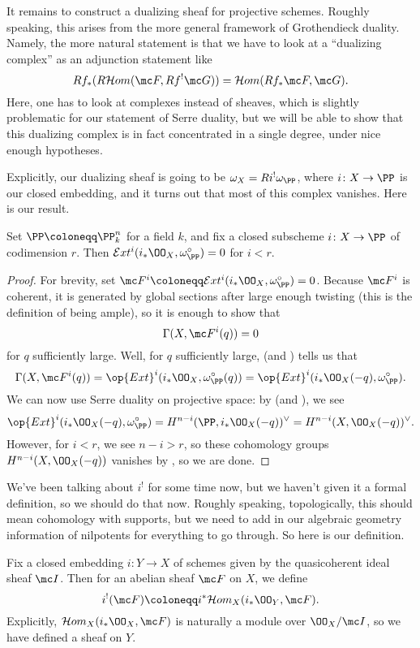 \documentclass[../notes.tex]{subfiles}
\begin{document}
It remains to construct a dualizing sheaf for projective schemes. Roughly speaking, this arises from the more general framework of Grothendieck duality. Namely, the more natural statement is that we have to look at a ``dualizing complex'' as an adjunction statement like
\[Rf_*(R\mathcal Hom(\mc F,Rf^!\mc G))=\mathcal Hom(Rf_*\mc F,\mc G).\]
Here, one has to look at complexes instead of sheaves, which is slightly problematic for our statement of Serre duality, but we will be able to show that this dualizing complex is in fact concentrated in a single degree, under nice enough hypotheses.

Explicitly, our dualizing sheaf is going to be $\omega_X=Ri^!\omega_\PP$, where $i\colon X\to\PP$ is our closed embedding, and it turns out that most of this complex vanishes. Here is our result.
\begin{proposition} \label{prop:lower-codim-dies}
	Set $\PP\coloneqq\PP^n_k$ for a field $k$, and fix a closed subscheme $i\colon X\to\PP$ of codimension $r$. Then $\mathcal Ext^i(i_*\OO_X,\omega_\PP^\circ)=0$ for $i<r$.
\end{proposition}
\begin{proof}
	For brevity, set $\mc F^i\coloneqq\mathcal Ext^i(i_*\OO_X,\omega_\PP^\circ)=0$. Because $\mc F^i$ is coherent, it is generated by global sections after large enough twisting (this is the definition of being ample), so it is enough to show that
	\[\Gamma(X,\mc F^i(q))=0\]
	for $q$ sufficiently large. Well, for $q$ sufficiently large,  (and ) tells us that
	\[\Gamma(X,\mc F^i(q))=\op{Ext}^i(i_*\OO_X,\omega^\circ_\PP(q))=\op{Ext}^i(i_*\OO_X(-q),\omega^\circ_\PP).\]
	We can now use Serre duality on projective space: by  (and ), we see
	\[\op{Ext}^i(i_*\OO_X(-q),\omega^\circ_\PP)=H^{n-i}(\PP,i_*\OO_X(-q))^\lor=H^{n-i}(X,\OO_X(-q))^\lor.\]
	However, for $i<r$, we see $n-i>r$, so these cohomology groups $H^{n-i}(X,\OO_X(-q))$ vanishes by , so we are done.
\end{proof}
We've been talking about $i^!$ for some time now, but we haven't given it a formal definition, so we should do that now. Roughly speaking, topologically, this should mean cohomology with supports, but we need to add in our algebraic geometry information of nilpotents for everything to go through. So here is our definition.
\begin{definition}
	Fix a closed embedding $i\colon Y\to X$ of schemes given by the quasicoherent ideal sheaf $\mc I$. Then for an abelian sheaf $\mc F$ on $X$, we define
	\[i^!(\mc F)\coloneqq i^*\mathcal Hom_X(i_*\OO_Y,\mc F).\]
	Explicitly, $\mathcal Hom_X(i_*\OO_X,\mc F)$ is naturally a module over $\OO_X/\mc I$, so we have defined a sheaf on $Y$.
\end{definition}
\end{document}
